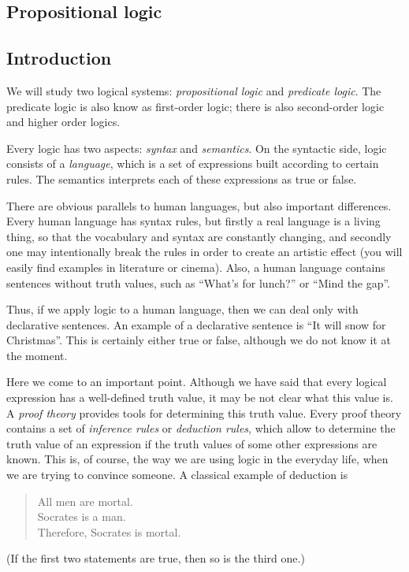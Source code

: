\begin{page}

\chapter{Propositional logic}
\section*{Introduction}
We will study two logical systems: \emph{propositional logic} and \emph{predicate logic}.
The predicate logic is also know as first-order logic; there is also second-order logic and higher order logics.

Every logic has two aspects: \emph{syntax} and \emph{semantics}.
On the syntactic side, logic consists of a \emph{language}, which is a set of expressions built according to certain rules.
The semantics interprets each of these expressions as true or false.

There are obvious parallels to human languages, but also important differences.
Every human language has syntax rules, but firstly a real language is a living thing, so that the vocabulary and syntax are constantly changing,
and secondly one may intentionally break the rules in order to create an artistic effect (you will easily find examples in literature or cinema).
Also, a human language contains sentences without truth values, such as ``What's for lunch?'' or ``Mind the gap''.

Thus, if we apply logic to a human language, then we can deal only with declarative sentences.
An example of a declarative sentence is ``It will snow for Christmas''.
This is certainly either true or false, although we do not know it at the moment.

Here we come to an important point.
Although we have said that every logical expression has a well-defined truth value, it may be not clear what this value is.
A \emph{proof theory} provides tools for determining this truth value.
Every proof theory contains a set of \emph{inference rules} or \emph{deduction rules},
which allow to determine the truth value of an expression if the truth values of some other expressions are known.
This is, of course, the way we are using logic in the everyday life, when we are trying to convince someone.
A classical example of deduction is
\begin{quote}
All men are mortal.\\
Socrates is a man.\\
Therefore, Socrates is mortal.
\end{quote}
(If the first two statements are true, then so is the third one.)


\end{page}
